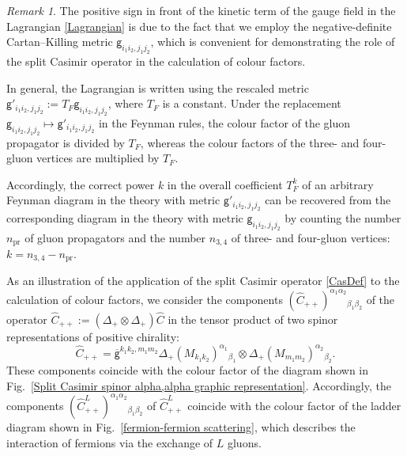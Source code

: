 \documentclass[a4paper]{article}
\newcommand{\hC}{\widehat{C}}
\newcommand{\kg}{\mathsf{g}}
\renewcommand{\=}{\ =\ }
\newcommand{\okg}{\overline{\mathsf{g}}}
\numberwithin{equation}{section}
\theoremstyle{remark}
\newtheorem{remark}{Remark}
\begin{document}
\begin{remark}
The positive sign in front of the kinetic term of the gauge field in the Lagrangian \eqref{Lagrangian} is due to the fact that we employ the negative-definite Cartan–Killing metric $\kg_{i_1i_2,j_1j_2}$, which is convenient for demonstrating the role of the split Casimir operator in the calculation of colour factors.

In general, the Lagrangian is written using the rescaled metric $\kg'_{i_1i_2,j_1j_2}:=T_F\kg_{i_1i_2,j_1j_2}$, where $T_F$ is a constant. Under the replacement $\kg_{i_1i_2,j_1j_2}\mapsto \kg'_{i_1i_2,j_1j_2}$ in the Feynman rules, the colour factor of the gluon propagator is divided by $T_F$, whereas the colour factors of the three- and four-gluon vertices are multiplied by $T_F$.

Accordingly, the correct power $k$ in the overall coefficient $T_F^k$ of an arbitrary Feynman diagram in the theory with metric $\kg'_{i_1i_2,j_1j_2}$ can be recovered from the corresponding diagram in the theory with metric $\kg_{i_1i_2,j_1j_2}$ by counting the number $n_{\text{pr}}$ of gluon propagators and the number $n_{3,4}$ of three- and four-gluon vertices: $k = n_{3,4} - n_{\text{pr}}$.
\end{remark}

As an illustration of the application of the split Casimir operator \eqref{CasDef} to the calculation of colour factors, we consider the components $(\hC_{++})^{\alpha_1\alpha_2}{}_{\beta_1\beta_2}$ of the operator $\hC_{++}:=(\Delta_+\otimes \Delta_+)\hC$ in the tensor product of two spinor representations of positive chirality:
\begin{equation}
\hC_{++}=\okg^{k_1k_2,m_1m_2}\Delta_+(M_{k_1k_2})^{\alpha_1}{}_{\beta_1}\otimes \Delta_+(M_{m_1m_2})^{\alpha_2}{}_{\beta_2}.
\end{equation}
These components coincide with the colour factor of the diagram shown in Fig.~\ref{Split Casimir spinor alpha,alpha graphic representation}.  Accordingly, the components $(\hC_{++}^L)^{\alpha_1\alpha_2}{}_{\beta_1\beta_2}$ of $\hC_{++}^L$ coincide with the colour factor of the ladder diagram shown in Fig.~\ref{fermion-fermion scattering}, which describes the interaction of fermions via the exchange of $L$ gluons.
\end{document}
